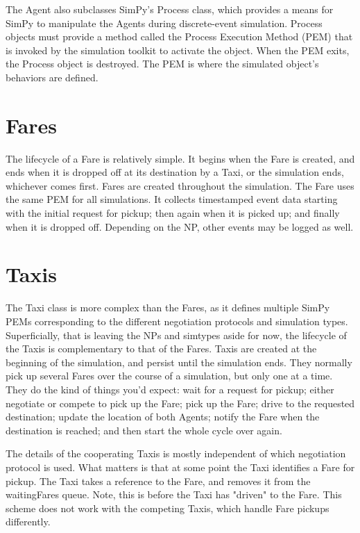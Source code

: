 \documentclass[11pt,letterpaper,onecolumn,twoside,openright,draft]{report}
\begin{document}
The Agent also subclasses SimPy's Process class, which provides a means for SimPy to manipulate the Agents during discrete-event simulation.
Process objects must provide a method called the Process Execution Method (PEM) that is invoked by the simulation toolkit to activate the object.
When the PEM exits, the Process object is destroyed.
The PEM is where the simulated object's behaviors are defined.

\section{Fares}
The lifecycle of a Fare is relatively simple.
It begins when the Fare is created, and ends when it is dropped off at its destination by a Taxi, or the simulation ends, whichever comes first.
Fares are created throughout the simulation.
The Fare uses the same PEM for all simulations.
It collects timestamped event data starting with the initial request for pickup; then again when it is picked up; and finally when it is dropped off.
Depending on the NP, other events may be logged as well.

\section{Taxis}
The Taxi class is more complex than the Fares, as it defines multiple SimPy PEMs corresponding to the different negotiation protocols and simulation types.
Superficially, that is leaving the NPs and simtypes aside for now, the lifecycle of the Taxis is complementary to that of the Fares.
Taxis are created at the beginning of the simulation, and persist until the simulation ends.
They normally pick up several Fares over the course of a simulation, but only one at a time.
They do the kind of things you'd expect: wait for a request for pickup; either negotiate or compete to pick up the Fare; pick up the Fare; drive to the requested destination; update the location of both Agents; notify the Fare when the destination is reached; and then start the whole cycle over again.

The details of the cooperating Taxis is mostly independent of which negotiation protocol is used.
What matters is that at some point the Taxi identifies a Fare for pickup.
The Taxi takes a reference to the Fare, and removes it from the waitingFares queue.
Note, this is before the Taxi has "driven" to the Fare.
This scheme does not work with the competing Taxis, which handle Fare pickups differently.
\end{document}
